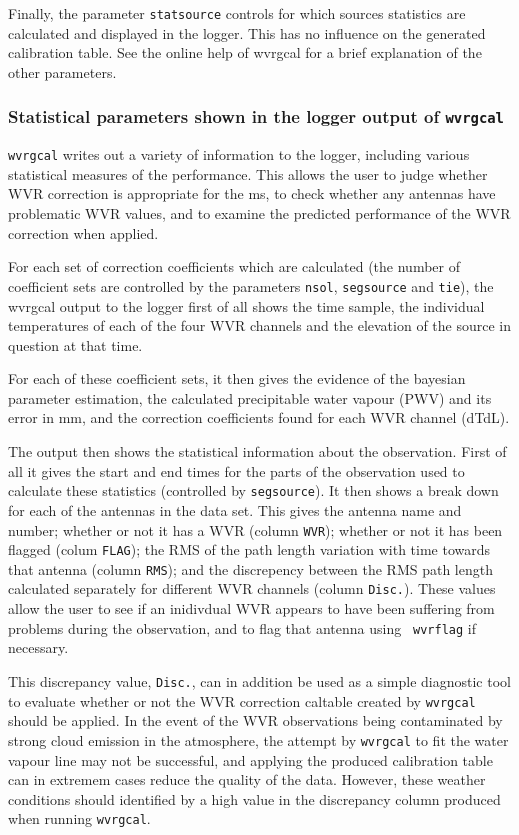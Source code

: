 Finally, the parameter {\tt statsource} controls for which sources statistics are calculated and
displayed in the logger. This has no influence on the generated calibration table.
See the online help of wvrgcal for a brief explanation of the other
parameters.


\subsubsection{Statistical parameters shown in the logger output of {\tt wvrgcal}}

{\tt wvrgcal} writes out a variety of information to
the logger, including various statistical measures of the performance.
This allows the user to judge whether WVR correction is appropriate
for the ms, to check whether any antennas have problematic WVR values,
and to examine the predicted performance of the WVR correction when
applied.

For each set of correction coefficients which are calculated (the
number of coefficient sets are controlled by the parameters
{\tt nsol}, {\tt segsource} and {\tt tie}), the wvrgcal output to the logger
first of all shows the
time sample, the individual temperatures of each of the four WVR
channels and the elevation of the source in question at that time. 

For each of these coefficient sets, it then gives the evidence of the
bayesian parameter estimation, the calculated precipitable water
vapour (PWV) and its error in mm, and the correction coefficients
found for each WVR channel (dTdL).

The output then shows the statistical information about the
observation. First of all it gives the start and end times for the
parts of the observation used to calculate these statistics
(controlled by {\tt segsource}).  It then shows a break down for each
of the antennas in the data set. This gives the antenna name and
number; whether or not it has a WVR (column {\tt WVR}); whether or not
it has been flagged (colum {\tt FLAG}); the RMS of the path length
variation with time towards that antenna (column {\tt RMS}); and the
discrepency between the RMS path length calculated separately for
different WVR channels (column {\tt Disc.}). These values allow the
user to see if an inidivdual WVR appears to have been suffering from
problems during the observation, and to flag that antenna using {\tt
  wvrflag} if necessary.

This discrepancy value, {\tt Disc.}, can in addition be used as a simple
diagnostic tool to evaluate whether or not the WVR correction caltable
created by {\tt wvrgcal} should be applied. In the event of the WVR
observations being contaminated by strong cloud emission in the
atmosphere, the attempt by {\tt wvrgcal} to fit the water vapour line
may not be successful, and applying the produced calibration table can
in extremem cases reduce the quality of the data. However, these
weather conditions should identified by a high value in the
discrepancy column produced when running {\tt wvrgcal}.

